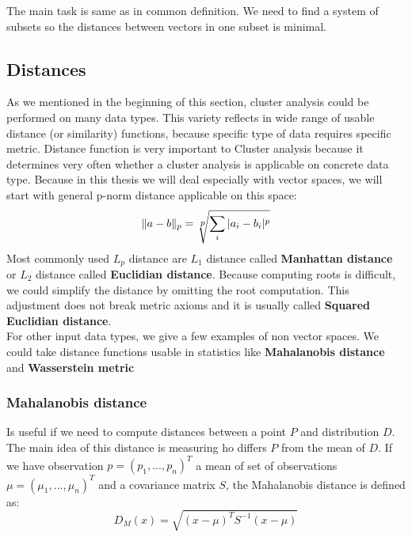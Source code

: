 The main task is same as in common definition. We need to find a system of subsets so the distances between vectors in one subset is minimal.

\subsection{Distances}
As we mentioned in the beginning of this section, cluster analysis could be performed on many data types. This variety reflects in wide range of usable distance (or similarity) functions, because specific type of data requires specific metric. Distance function is very important to Cluster analysis because it determines very often whether a cluster analysis is applicable on concrete data type. Because in this thesis we will deal especially with vector spaces, we will start with general p-norm distance applicable on this space: $$\|a-b\|_p=\sqrt[\leftroot{-1}\uproot{3}\scriptstyle p]{\sum_i |a_i - b_i|^p} $$
Most commonly used $L_p$ distance are $L_1$ distance called \textbf{Manhattan distance} or $L_2$ distance called \textbf{Euclidian distance}.
Because computing roots is difficult, we could simplify the distance by omitting the root computation. This adjustment does not break metric axioms and it is usually called \textbf{Squared Euclidian distance}.\\

For other input data types, we give a few examples of non vector spaces. We could take distance functions usable in statistics like \textbf{Mahalanobis distance} and \textbf{Wasserstein metric}

\subsubsection{Mahalanobis distance}
Is useful if we need to compute distances between a point $P$ and distribution $D$. The main idea of this distance is measuring ho differs $P$ from the mean of $D$.
If we have observation $p=(p_1,...,p_n)^T$ a mean of set of observations $\mu=(\mu_1,...,\mu_n)^T$ and a covariance matrix $S$, the Mahalanobis distance is defined as:
$$D_M(x) = \sqrt{(x - \mu)^T S^{-1} (x-\mu)}$$


